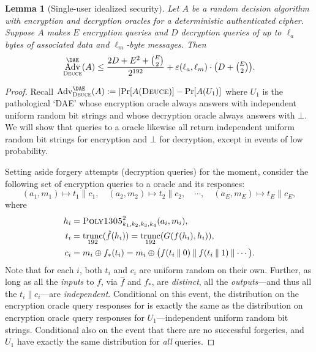 \documentclass[draft]{article}
\newtheorem{lemma}{Lemma}
\DeclareRobustCommand{\operatorsc}[1]{{%
  \ifmmode\let\next=\operatorname\else\let\next=\relax\fi\next{\textsc{#1}}}}
\def\Poly#1/{\operatorsc{Poly#1}}
\def\Deuce/{\operatorsc{Deuce}}
\DeclareMathOperator{\Adv}{Adv}
\DeclareMathOperator{\trunc}{trunc}
\newcommand{\concat}{\mathbin\|}
\newcommand{\collisionbound}{\varepsilon}
\begin{document}
\begin{lemma}[Single-user idealized security]\label{lem-su-ideal}
  Let $A$ be a random decision algorithm with encryption and
   decryption oracles for a deterministic authenticated cipher.
  Suppose $A$ makes $E$ encryption queries and $D$ decryption queries
   of up to $\ell_a$ bytes of associated data and $\ell_m$-byte
   messages.
  Then
  \[
    \Adv^{\DAE}_{\Deuce/}(A)
    \leq \frac{2 D + E^2 + \binom{E}{2}}{2^{192}}
         + \collisionbound(\ell_a, \ell_m)
           \cdot
           {\textstyle\bigl(D + \binom{E}{2}\bigr)}.
  \]
\end{lemma}

\begin{proof}

Recall
 $\Adv^{\DAE}_{\Deuce/}(A) := \lvert\Pr[A(\Deuce/)] - \Pr[A(U_1)]$
 where $U_1$ is the pathological `DAE' whose encryption oracle always
 answers with independent uniform random bit strings and whose
 decryption oracle always answers with $\bot$.
We will show that queries to a \Deuce/ oracle likewise all return
 independent uniform random bit strings for encryption and $\bot$ for
 decryption, except in events of low probability.

Setting aside forgery attempts (decryption queries) for the moment,
 consider the following set of encryption queries to a \Deuce/ oracle
 and its responses:
\[
  (a_1, m_1) \mapsto t_1 \concat c_1, \quad
  (a_2, m_2) \mapsto t_2 \concat c_2, \quad
  \cdots, \quad
  (a_E, m_E) \mapsto t_E \concat c_E,
\]
 where
\[
\begin{aligned}
  h_i &= \Poly1305/^2_{k_1,k_2,k_3,k_4}(a_i, m_i), \\
  t_i &= \trunc_{192}(\hat f(h_i)) = \trunc_{192}(G(f(h_i), h_i)), \\
  c_i &= m_i \oplus f_*(t_i)
       = m_i \oplus \bigl(
           f(t_i \concat 0) \concat
           f(t_i \concat 1) \concat
         \dotsb\bigr).
\end{aligned}
\]
Note that for each $i$, both $t_i$ and $c_i$ are uniform random on
 their own.
Further, as long as all the \emph{inputs} to $f$, via $\hat f$ and
 $f_*$, are \emph{distinct}, all the \emph{outputs}---and thus all the
 $t_i \concat c_i$---are \emph{independent}.
Conditional on this event, the distribution on the encryption oracle
 query responses for \Deuce/ is exactly the same as the distribution on
 encryption oracle query responses for $U_1$---independent uniform
 random bit strings.
Conditional also on the event that there are no successful forgeries,
 \Deuce/ and $U_1$ have exactly the same distribution for \emph{all}
 queries.


\end{proof}
\end{document}
